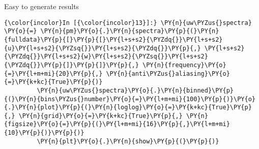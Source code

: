 
\begin{exampleblock}{Easy to generate results}
    \begin{Verbatim}[commandchars=\\\{\}]
{\color{incolor}In [{\color{incolor}13}]:} \PY{n}{uw\PYZus{}spectra} \PY{o}{=} \PY{n}{pm}\PY{o}{.}\PY{n}{spectra}\PY{p}{(}\PY{n}{fulldata}\PY{p}{[}\PY{p}{[}\PY{l+s+s2}{\PYZdq{}}\PY{l+s+s2}{u}\PY{l+s+s2}{\PYZsq{}}\PY{l+s+s2}{\PYZdq{}}\PY{p}{,} \PY{l+s+s2}{\PYZdq{}}\PY{l+s+s2}{w}\PY{l+s+s2}{\PYZsq{}}\PY{l+s+s2}{\PYZdq{}}\PY{p}{]}\PY{p}{]}\PY{p}{,} \PY{n}{frequency}\PY{o}{=}\PY{l+m+mi}{20}\PY{p}{,} \PY{n}{anti\PYZus{}aliasing}\PY{o}{=}\PY{k+kc}{True}\PY{p}{)}
         \PY{n}{uw\PYZus{}spectra}\PY{o}{.}\PY{n}{binned}\PY{p}{(}\PY{n}{bins\PYZus{}number}\PY{o}{=}\PY{l+m+mi}{100}\PY{p}{)}\PY{o}{.}\PY{n}{plot}\PY{p}{(}\PY{n}{loglog}\PY{o}{=}\PY{k+kc}{True}\PY{p}{,} \PY{n}{grid}\PY{o}{=}\PY{k+kc}{True}\PY{p}{,} \PY{n}{figsize}\PY{o}{=}\PY{p}{(}\PY{l+m+mi}{16}\PY{p}{,}\PY{l+m+mi}{10}\PY{p}{)}\PY{p}{)}
         \PY{n}{plt}\PY{o}{.}\PY{n}{show}\PY{p}{(}\PY{p}{)}
\end{Verbatim}


    \begin{center}
    \end{center}
    { \hspace*{\fill} \\}
    \end{exampleblock}

    
    
